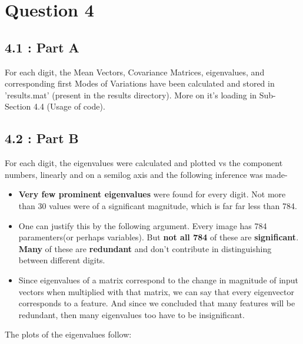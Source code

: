 \documentclass[12pt, a4paper]{article}
\begin{document}
\section*{Question 4}
\subsection*{4.1 : Part A}
\hspace{1cm} For each digit, the Mean Vectors, Covariance Matrices, eigenvalues, and corresponding first Modes of Variations have been calculated and stored in 'results.mat' (present in the results directory). More on it's loading in Sub-Section 4.4 (Usage of code).
\subsection*{4.2 : Part B}
\hspace{1cm} For each digit, the eigenvalues were calculated and plotted vs the component numbers, linearly and on a semilog axis and the following inference was made-
\begin{itemize}
\item \textbf{Very few prominent eigenvalues} were found for every digit. Not more than 30 values were of a significant magnitude, which is far far less than 784.
\item One can justify this by the following argument. Every image has 784 paramenters(or perhaps variables). But \textbf{not all 784} of these are \textbf{significant}. \textbf{Many} of these are \textbf{redundant} and don't contribute in distinguishing between different digits.
\item Since eigenvalues of a matrix correspond to the change in magnitude of input vectors when multiplied with that matrix, we can say that every eigenvector corresponds to a feature. And since we concluded that many features will be redundant, then many eigenvalues too have to be insignificant.
\end{itemize}

\noindent The plots of the eigenvalues follow:
\end{document}
